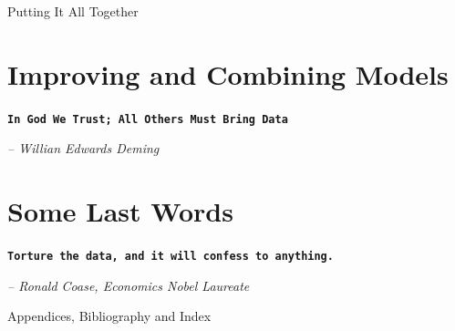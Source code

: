 \documentclass[10pt, letterpaper, twoside]{memoir}\usepackage{knitr}
\makeatletter
\newcommand{\chapterendsymbol}{
    \vspace{24pt}
    \Huge
    \hrulefill \hspace{0.1in} \hspace{0.1in} \hrulefill
    \normalsize
    }
\renewcommand\part{%
  \if@openright
    \cleardoublepage
  \else
    \clearpage
  \fi
  \thispagestyle{empty}
  \null\vfil
  \secdef\@part\@spart
  }
\makeatother
\begin{document}
\vspace{12pt}

\chapterendsymbol



\part{Putting It All Together}




\chapter{Improving and Combining Models}

\begin{flushright}

\textbf{\texttt{In God We Trust; All Others Must Bring Data}}

\emph{-- Willian Edwards Deming}

\end{flushright}

\vspace{12pt}

\chapterendsymbol





\chapter{Some Last Words}

\begin{flushright}

\textbf{\texttt{Torture the data, and it will confess to anything.}}

\emph{-- Ronald Coase, Economics Nobel Laureate}

\end{flushright}

\vspace{12pt}


\chapterendsymbol



\part{Appendices, Bibliography and Index}

\appendix



\end{document}
